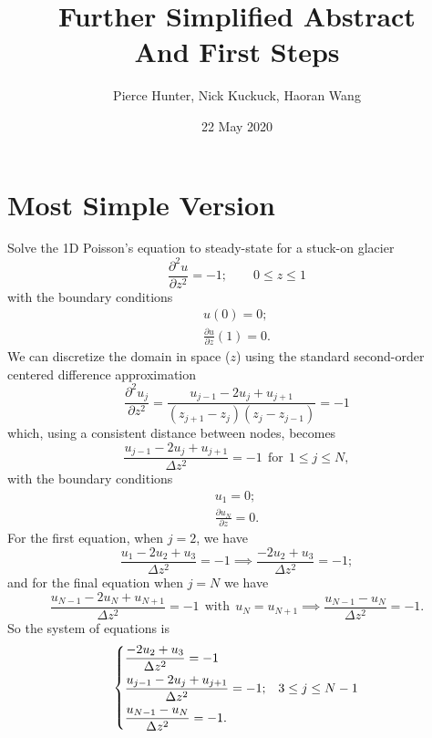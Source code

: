\documentclass[11pt]{article}
\title{Further Simplified Abstract\\And First Steps}
\author{Pierce Hunter, Nick Kuckuck, Haoran Wang}
\date{22 May 2020}
\newcommand{\pd}[2]{\frac{\partial #1}{\partial #2}}
\begin{document}
	
	\maketitle
	
	\section{Most Simple Version}
	Solve the 1D Poisson's equation to steady-state for a stuck-on glacier
	\begin{equation}
		\pd{^2u}{z^2} = -1; \qquad 0\leq z\leq 1
	\end{equation}
	with the boundary conditions
	\begin{gather}
		u\left(0\right) = 0;\\
		\pd{u}{z}(1) = 0.
	\end{gather}
	We can discretize the domain in space ($ z $) using the standard second-order centered difference approximation
	\begin{equation}
		\pd{^2u_j}{z^2} = \frac{u_{j-1}-2u_j+u_{j+1}}{\left(z_{j+1}-z_j\right)\left(z_j-z_{j-1}\right)} = -1
	\end{equation}
	which, using a consistent distance between nodes, becomes
	\begin{equation}
		\frac{u_{j-1}-2u_j+u_{j+1}}{\Delta z^2} = -1 ~~\text{for}~~ 1\leq j\leq N,
	\end{equation}
	with the boundary conditions
	\begin{gather}
		u_1 = 0;\\
		\pd{u_N}{z} = 0.
	\end{gather}
	For the first equation, when $ j = 2 $, we have
	\begin{equation}
		\frac{u_1 -2u_2 + u_3}{\Delta z^2} = -1 \implies \frac{-2u_2 + u_3}{\Delta z^2} = -1;
	\end{equation}
	and for the final equation when $ j = N $ we have
	\begin{equation}
		\frac{u_{N-1} - 2u_N + u_{N+1}}{\Delta z^2} = -1 ~~\text{with}~~ u_N = u_{N+1} \implies \frac{u_{N-1} - u_N}{\Delta z^2} = -1.
	\end{equation}
	So the system of equations is
	\begin{equation}
		\begin{dcases}
		\frac{-2u_2 + u_3}{\Delta z^2} = -1\\
		\frac{u_{j-1}-2u_j+u_{j+1}}{\Delta z^2} = -1;& 3\leq j\leq N-1\\
		\frac{u_{N-1} - u_N}{\Delta z^2} = -1.
		\end{dcases}
	\end{equation}
\end{document}
